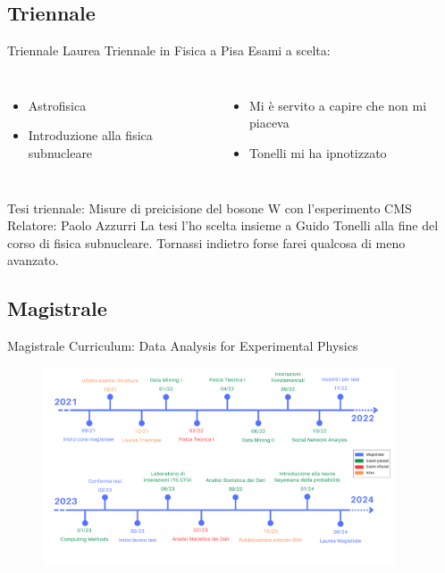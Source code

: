 \documentclass[
10pt,
aspectratio=169,
]{beamer}
\begin{document}
\subsection{Triennale}
\begin{frame}{Triennale}
Laurea Triennale in Fisica a Pisa 
\vfill
Esami a scelta:
\begin{columns}
\begin{itemize}
    \item Astrofisica 
    \item Introduzione alla fisica subnucleare
\end{itemize}
\begin{itemize}
    \item Mi è servito a capire che non mi piaceva
    \item Tonelli mi ha ipnotizzato
\end{itemize}
    \end{columns}
    \vfill
    Tesi triennale: Misure di preicisione del bosone W con l'esperimento CMS\\
    Relatore: Paolo Azzurri
    \vfill
    La tesi l'ho scelta insieme a Guido Tonelli alla fine del corso di fisica subnucleare. Tornassi indietro forse farei qualcosa di meno avanzato.
\end{frame}
\subsection{Magistrale}

\begin{frame}{Magistrale}
Curriculum: Data Analysis for Experimental Physics

    \begin{figure}
        \centering
        \includegraphics[width=0.93\textwidth]{figures/timeline.pdf}
    \end{figure}
\end{frame}
\end{document}
